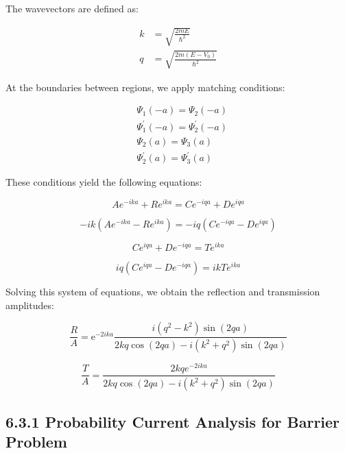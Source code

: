 \documentclass[10pt]{article}
\begin{document}
The wavevectors are defined as:

\begin{align*}
k & =\sqrt{\frac{2 m E}{\hbar^{2}}} \\
q & =\sqrt{\frac{2 m\left(E-V_{0}\right)}{\hbar^{2}}} \tag{6.53}
\end{align*}

At the boundaries between regions, we apply matching conditions:

\begin{align*}
& \Psi_{1}(-a)=\Psi_{2}(-a) \\
& \Psi_{1}^{\prime}(-a)=\Psi_{2}^{\prime}(-a) \\
& \Psi_{2}(a)=\Psi_{3}(a)  \tag{6.54}\\
& \Psi_{2}^{\prime}(a)=\Psi_{3}^{\prime}(a)
\end{align*}

These conditions yield the following equations:

\begin{equation*}
A e^{-i k a}+R e^{i k a}=C e^{-i q a}+D e^{i q a} \tag{6.55}
\end{equation*}

\begin{equation*}
-i k\left(A e^{-i k a}-R e^{i k a}\right)=-i q\left(C e^{-i q a}-D e^{i q a}\right) \tag{6.56}
\end{equation*}

\begin{equation*}
C e^{i q a}+D e^{-i q a}=T e^{i k a} \tag{6.57}
\end{equation*}

\begin{equation*}
i q\left(C e^{i q a}-D e^{-i q a}\right)=i k T e^{i k a} \tag{6.58}
\end{equation*}

Solving this system of equations, we obtain the reflection and transmission amplitudes:

\begin{equation*}
\frac{R}{A}=\mathrm{e}^{-2 i k a} \frac{i\left(q^{2}-k^{2}\right) \sin (2 q a)}{2 k q \cos (2 q a)-i\left(k^{2}+q^{2}\right) \sin (2 q a)} \tag{6.59}
\end{equation*}

\begin{equation*}
\frac{T}{A}=\frac{2 k q e^{-2 i k a}}{2 k q \cos (2 q a)-i\left(k^{2}+q^{2}\right) \sin (2 q a)} \tag{6.60}
\end{equation*}


\subsection*{6.3.1 Probability Current Analysis for Barrier Problem}
\end{document}
